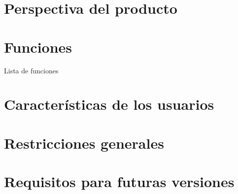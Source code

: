 
\section{Perspectiva del producto}

\section{Funciones}

Lista de funciones

\section{Características de los usuarios}

\section{Restricciones generales}

\section{Requisitos para futuras versiones}







